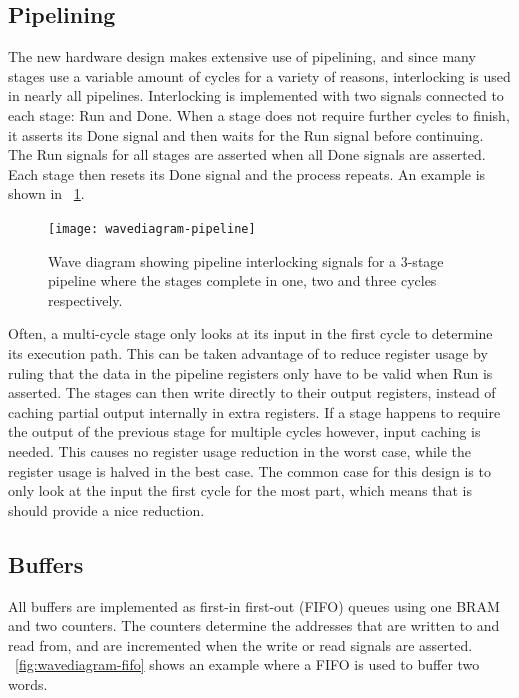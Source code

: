 \subsection{Pipelining}

The new hardware design makes extensive use of pipelining, and since many stages use a variable amount of cycles for a variety of reasons, interlocking is used in nearly all pipelines.
Interlocking is implemented with two signals connected to each stage: Run and Done.
When a stage does not require further cycles to finish, it asserts its Done signal and then waits for the Run signal before continuing.
The Run signals for all stages are asserted when all Done signals are asserted.
Each stage then resets its Done signal and the process repeats.
An example is shown in \figurename~\ref{fig:wavediagram-pipeline}.

\begin{figure}[!ht]
    \centering
    \texttt{[image: wavediagram-pipeline]}
    \caption[Pipeline wave diagram]{
        Wave diagram showing pipeline interlocking signals for a 3-stage pipeline where the stages complete in one, two and three cycles respectively.
    }
    \label{fig:wavediagram-pipeline}
\end{figure}

Often, a multi-cycle stage only looks at its input in the first cycle to determine its execution path.
This can be taken advantage of to reduce register usage by ruling that the data in the pipeline registers only have to be valid when Run is asserted.
The stages can then write directly to their output registers, instead of caching partial output internally in extra registers.
If a stage happens to require the output of the previous stage for multiple cycles however, input caching is needed.
This causes no register usage reduction in the worst case, while the register usage is halved in the best case.
The common case for this design is to only look at the input the first cycle for the most part, which means that is should provide a nice reduction.

\subsection{Buffers}

All buffers are implemented as first-in first-out (FIFO) queues using one BRAM and two counters.
The counters determine the addresses that are written to and read from, and are incremented when the write or read signals are asserted.
\figurename~\ref{fig:wavediagram-fifo} shows an example where a FIFO is used to buffer two words.

